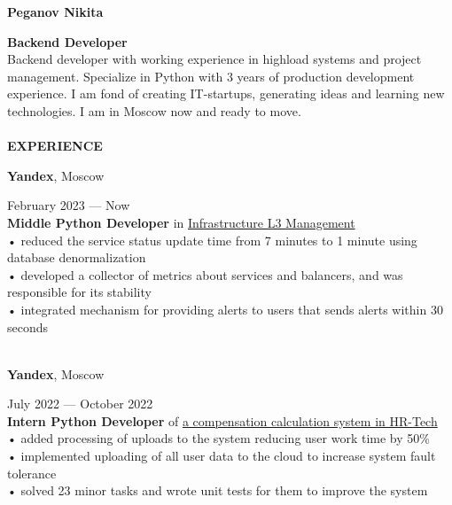 \documentclass{article}
\begin{document}
\begin{vwcol}[widths={0.8,0.2},
 sep=.8cm, justify=flush,rule=0pt,indent=1em] 
\begin{spacing}{1.1}
\noindent\textbf{\Huge{Peganov Nikita}}\\
\end{spacing}
\noindent\textcolor[rgb]{0.1255,0.2902,0.7843}{\textbf{\Large{Backend Developer}}}\\
Backend developer with working experience in highload systems and project management. Specialize in Python with 3 years of production development experience. I am fond of creating IT-startups, generating ideas and learning new technologies. I am in Moscow now and ready to move.\\
\\
\noindent\textcolor[rgb]{0.1255,0.2902,0.7843}{\textbf{\Large{EXPERIENCE}}}\\
\begin{Large}
\textbf{Yandex}, Moscow
\end{Large}
\hspace{215pt}February 2023 — Now\\
\textbf{Middle Python Developer} in \href{https://infraevents.yandex.ru/}{Infrastructure L3 Management}\\
• reduced the service status update time from 7 minutes to 1 minute using database denormalization\\
• developed a collector of metrics about services and balancers, and was responsible for its stability\\
• integrated mechanism for providing alerts to users that sends alerts within 30 seconds\\
\\
\begin{Large}
\textbf{Yandex}, Moscow
\end{Large}
\hspace{200pt}July 2022 — October 2022\\
\textbf{Intern Python Developer} of \href{https://yandex.cloud/ru/isv/hrtech}{a compensation calculation system in HR-Tech}\\
• added processing of uploads to the system reducing user work time by 50\%\\
• implemented uploading of all user data to the cloud to increase system fault tolerance\\
• solved 23 minor tasks and wrote unit tests for them to improve the system\\
\\

\end{vwcol}
\end{document}
